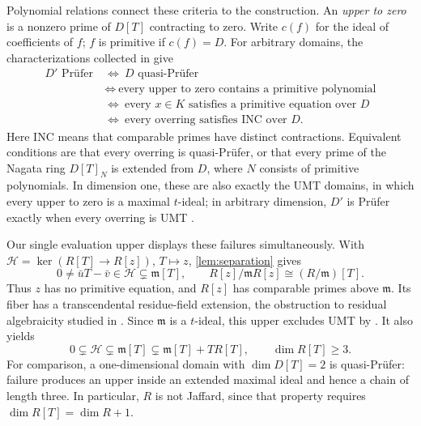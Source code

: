 \documentclass[11pt,reqno]{amsart}
\numberwithin{equation}{section}
\theoremstyle{plain}
\newcommand{\mm}{\mathfrak m}
\begin{document}
Polynomial relations connect these criteria to the construction.
An \emph{upper to zero} is a nonzero prime of $D[T]$ contracting to zero.
Write $c(f)$ for the ideal of coefficients of $f$; $f$ is primitive if
$c(f)=D$. For arbitrary domains, the characterizations collected in
\cite[Thm.~1.1]{ChangFontana2009} give
\[
\begin{aligned}
 D'\text{ Pr\"ufer}
 &\ \Longleftrightarrow\ D\text{ quasi-Pr\"ufer}\\
 &\ \Longleftrightarrow\ \text{every upper to zero contains a primitive polynomial}\\
 &\ \Longleftrightarrow\ \text{every }x\in K\text{ satisfies a primitive equation over }D\\
 &\ \Longleftrightarrow\ \text{every overring satisfies INC over }D.
\end{aligned}
\]
Here INC means that comparable primes have distinct contractions.
Equivalent conditions are that every overring is quasi-Pr\"ufer, or that
every prime of the Nagata ring $D[T]_N$ is extended from $D$, where $N$
consists of primitive polynomials. In dimension one, these are also
exactly the UMT domains, in which every upper to zero is a maximal
$t$-ideal; in arbitrary dimension, $D'$ is Pr\"ufer exactly when every
overring is UMT \cite[Thms.~1.1, 1.5, Cor.~3.11]{FontanaGabelliHouston1998}.

Our single evaluation upper displays these failures simultaneously.
With $\mathcal H=\ker(R[T]\to R[z])$, $T\mapsto z$,
\cref{lem:separation} gives
\begin{equation}\label{eq:literature-obstruction}
 0\ne\bar uT-\bar v\in\mathcal H\subsetneq\mm[T],\qquad
 R[z]/\mm R[z]\cong(R/\mm)[T].
\end{equation}
Thus $z$ has no primitive equation, and $R[z]$ has comparable primes
above $\mm$. Its fiber has a transcendental residue-field extension,
the obstruction to residual algebraicity studied in
\cite[Thm.~2.3, Cor.~2.8]{AyacheJaballah1997}.
Since $\mm$ is a $t$-ideal, this upper excludes UMT by
\cite[Thm.~1.1]{FontanaGabelliHouston1998}. It also yields
\[
 0\subsetneq\mathcal H\subsetneq\mm[T]
   \subsetneq\mm[T]+TR[T],\qquad \dim R[T]\geq3.
\]
For comparison, a one-dimensional domain with $\dim D[T]=2$ is
quasi-Pr\"ufer: failure produces an upper inside an extended maximal
ideal and hence a chain of length three. In particular, $R$ is not
Jaffard, since that property requires $\dim R[T]=\dim R+1$.
\end{document}
